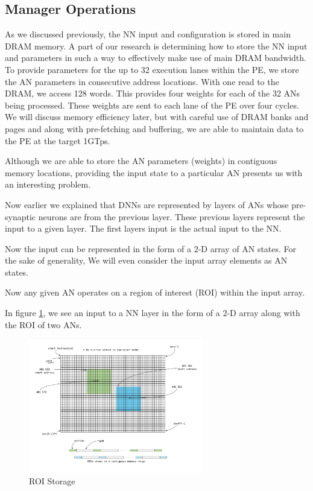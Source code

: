 \documentclass[journal]{IEEEtran}
\begin{document}
\subsection{Manager Operations}
\label{sec:Manager Operations}

As we discussed previously, the NN input and configuration is stored in main DRAM memory. A part of our research is determining how to store the NN input and parameters in such a way to effectively make use of main DRAM bandwidth. To provide parameters for the up to 32 execution lanes within the PE, we store the AN parameters in consecutive address locations. With one read to the DRAM, we access 128 words. This provides four weights for each of the 32 ANs being processed. These weights are sent to each lane of the PE over four cycles. We will discuss memory efficiency later, but with careful use of DRAM banks and pages and along with pre-fetching and buffering, we are able to maintain data to the PE at the target 1GTps.

Although we are able to store the AN parameters (weights) in contiguous memory locations, providing the input state to a particular AN presents us with an interesting problem.

Now earlier we explained that DNNs are represented by layers of ANs whose pre-synaptic neurons are from the previous layer. These previous layers represent the input to a given layer. The first layers input is the actual input to the NN.

Now the input can be represented in the form of a 2-D array of AN states. For the sake of generality, We will even consider the input array elements as AN states.

Now any given AN operates on a region of interest (ROI) within the input array.

In figure \ref{fig:roiStorage}, we see an input to a NN layer in the form of a 2-D array along with the ROI of two ANs.

\begin{figure}[!t]
\centerline{
\mbox{\includegraphics[width=3.0in]{roiStorage.jpg}}
}
\caption{ROI Storage}
\label{fig:roiStorage}
\end{figure}
\end{document}
